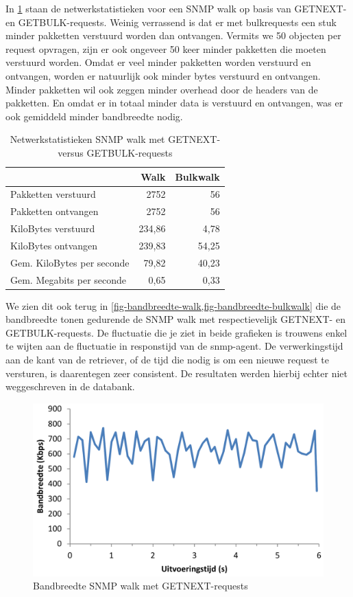 In \cref{tabel-bandbreedte-walk-vs-bulk} staan de netwerkstatistieken voor een SNMP walk op basis van GETNEXT- en GETBULK-requests.
Weinig verrassend is dat er met bulkrequests een stuk minder pakketten verstuurd worden dan ontvangen.
Vermits we 50 objecten per request opvragen, zijn er ook ongeveer 50 keer minder pakketten die moeten verstuurd worden.
Omdat er veel minder pakketten worden verstuurd en ontvangen, worden er natuurlijk ook minder bytes verstuurd en ontvangen.
Minder pakketten wil ook zeggen minder overhead door de headers van de pakketten.
En omdat er in totaal minder data is verstuurd en ontvangen, was er ook gemiddeld minder bandbreedte nodig.


\begin{table}[h]
\centering
\begin{tabular}{@{}lrr@{}}
\toprule
                           & Walk   & Bulkwalk \\ \midrule
Pakketten verstuurd        & 2752   & 56       \\
Pakketten ontvangen        & 2752   & 56       \\
KiloBytes verstuurd        & 234,86 & 4,78     \\
KiloBytes ontvangen        & 239,83 & 54,25    \\
Gem. KiloBytes per seconde & 79,82  & 40,23    \\
Gem. Megabits per seconde  & 0,65   & 0,33     \\ \bottomrule
\end{tabular}
\caption{Netwerkstatistieken SNMP walk met GETNEXT- versus GETBULK-requests}
\label{tabel-bandbreedte-walk-vs-bulk}
\end{table}

We zien dit ook terug in \cref{fig-bandbreedte-walk,fig-bandbreedte-bulkwalk} die de bandbreedte tonen gedurende
de SNMP walk met respectievelijk GETNEXT- en GETBULK-requests.
De fluctuatie die je ziet in beide grafieken is trouwens enkel te wijten aan de fluctuatie in responstijd van de \gls{snmp-agent}.
De verwerkingstijd aan de kant van de retriever, of de tijd die nodig is om een nieuwe request te versturen, is daarentegen zeer consistent.
De resultaten werden hierbij echter niet weggeschreven in de databank.

\begin{figure}[h]
	\centering
	\includegraphics[scale=0.40]{figures/bandbreedte/snmpwalk}
	\caption{Bandbreedte SNMP walk met GETNEXT-requests}
	\label{fig-bandbreedte-walk}
\end{figure}

